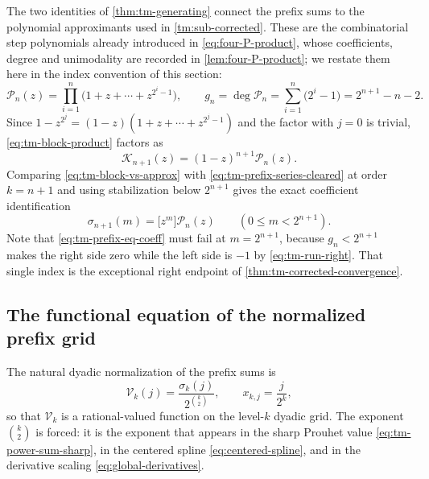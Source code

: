 \documentclass[11pt,oneside]{article}
\theoremstyle{definition}
\theoremstyle{remark}
\begin{document}
The two identities of \cref{thm:tm-generating} connect the prefix sums to the polynomial
approximants used in \cref{tm:sub-corrected}.  These are the combinatorial step polynomials
already introduced in \eqref{eq:four-P-product}, whose coefficients, degree and unimodality
are recorded in \cref{lem:four-P-product}; we restate them here in the index convention of
this section:
\begin{equation}
 \mathcal P_n(z)=\prod_{i=1}^{n}\bigl(1+z+\cdots+z^{2^i-1}\bigr),
 \qquad
 g_n=\deg \mathcal P_n=\sum_{i=1}^{n}\bigl(2^i-1\bigr)=2^{n+1}-n-2.
                                                          \label{eq:tm-approx-poly}
\end{equation}
Since $1-z^{2^j}=(1-z)(1+z+\cdots+z^{2^j-1})$ and the factor with $j=0$ is trivial,
\eqref{eq:tm-block-product} factors as
\begin{equation}
 \mathcal K_{n+1}(z)=(1-z)^{n+1}\mathcal P_n(z).                    \label{eq:tm-block-vs-approx}
\end{equation}
Comparing \eqref{eq:tm-block-vs-approx} with \eqref{eq:tm-prefix-series-cleared} at order
$k=n+1$ and using stabilization below $2^{n+1}$ gives the exact coefficient identification
\begin{equation}
 \sigma_{n+1}(m)=\bigl[z^m\bigr]\mathcal P_n(z)\qquad(0\le m<2^{n+1}).
                                                          \label{eq:tm-prefix-eq-coeff}
\end{equation}
Note that \eqref{eq:tm-prefix-eq-coeff} must fail at $m=2^{n+1}$, because
$g_n<2^{n+1}$ makes the right side zero while the left side is $-1$ by
\eqref{eq:tm-run-right}.  That single index is the exceptional right endpoint of
\cref{thm:tm-corrected-convergence}.

\subsection{The functional equation of the normalized prefix grid}
\label{tm:sub-grid-equation}

The natural dyadic normalization of the prefix sums is
\begin{equation}
 \mathcal V_k(j)=\frac{\sigma_k(j)}{2^{\binom k2}},
 \qquad
 x_{k,j}=\frac j{2^k},                                     \label{eq:tm-grid-def}
\end{equation}
so that $\mathcal V_k$ is a rational-valued function on the level-$k$ dyadic grid.  The
exponent $\binom k2$ is forced: it is the exponent that appears in the sharp Prouhet value
\eqref{eq:tm-power-sum-sharp}, in the centered spline \eqref{eq:centered-spline}, and in the
derivative scaling \eqref{eq:global-derivatives}.
\end{document}
